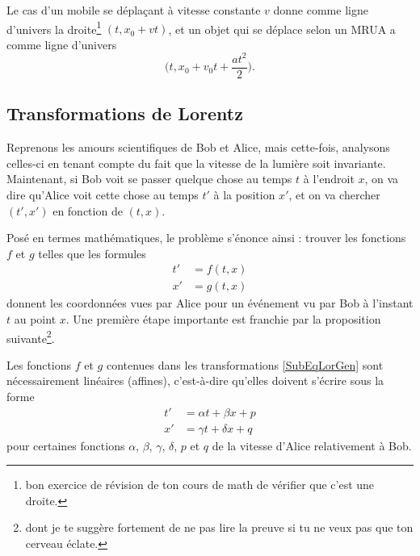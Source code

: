 Le cas d'un mobile se déplaçant à vitesse constante \( v\) donne comme ligne d'univers la droite\footnote{bon exercice de révision de ton cours de math de vérifier que c'est une droite.} \( (t,x_0+vt)\), et un objet qui se déplace selon un MRUA a comme ligne d'univers
\[
	\big( t, x_0+v_0t+\frac{ at^2 }{ 2 } \big).
\]

\subsection{Transformations de Lorentz}

Reprenons les amours scientifiques de Bob et Alice, mais cette-fois, analysons celles-ci en tenant compte du fait que la vitesse de la lumière soit invariante. Maintenant, si Bob voit se passer quelque chose au temps \( t\) à l'endroit \( x\), on va dire qu'Alice voit cette chose au temps \( t'\) à la position \( x'\), et on va chercher \( (t',x')\) en fonction de \( (t,x)\).

Posé en termes mathématiques, le problème s'énonce ainsi : trouver les fonctions \( f\) et \( g\) telles que les formules
\begin{subequations}	\label{SubEqLorGen}
	\begin{align}
		t' & =f(t,x) \\
		x' & =g(t,x)
	\end{align}
\end{subequations}
donnent les coordonnées vues par Alice pour un événement vu par Bob à l'instant \( t\) au point \( x\). Une première étape importante est franchie par la proposition suivante\footnote{dont je te suggère fortement de ne pas lire la preuve si tu ne veux pas que ton cerveau éclate.}.

\begin{proposition}
	Les fonctions \( f\) et \( g\) contenues dans les transformations \eqref{SubEqLorGen} sont nécessairement linéaires (affines), c'est-à-dire qu'elles doivent s'écrire sous la forme
	\[
		\begin{split}
			t'&=\alpha t+\beta x+p	\\
			x'&=\gamma t+\delta x+q
		\end{split}
	\]
	pour certaines fonctions \( \alpha\), \( \beta\), \( \gamma\), \( \delta\), \( p\) et \( q\) de la vitesse d'Alice relativement à Bob.
\end{proposition}

